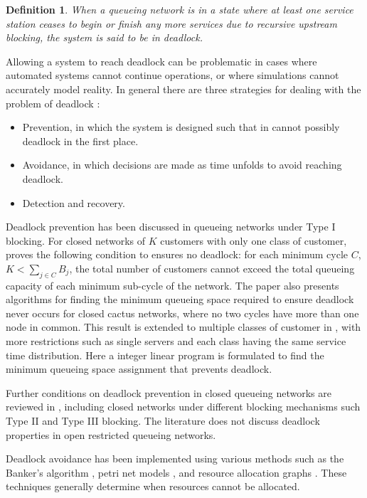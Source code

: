 \documentclass{article}
\newtheorem{definition}{Definition}
\numberwithin{equation}{section}
\begin{document}
\begin{definition}
    When a queueing network is in a state where at least one service
    station ceases to begin or finish any more services due to
    recursive upstream blocking, the system is said to be in deadlock.
\end{definition}


Allowing a system to reach deadlock can be problematic in cases where automated systems cannot continue operations, or where simulations cannot accurately model reality.
In general there are three strategies for dealing with the problem of deadlock \cite{kawadkaretal14, elmagarmid86}:

\begin{itemize}
  \item Prevention, in which the system is designed such that in cannot possibly deadlock in the first place.
  \item Avoidance, in which decisions are made as time unfolds to avoid reaching deadlock.
  \item Detection and recovery.
\end{itemize}

Deadlock prevention has been discussed in queueing networks under Type I blocking.
For closed networks of $K$ customers with only one class of customer, \cite{kunduakyildiz89} proves the following condition to ensures no deadlock: for each minimum cycle $C$, $K < \sum_{j\in C} B_j$, the total number of customers cannot exceed the total queueing capacity of each minimum sub-cycle of the network.
The paper also presents algorithms for finding the minimum queueing space required to ensure deadlock never occurs for closed cactus networks, where no two cycles have more than one node in common.
This result is extended to multiple classes of customer in \cite{liebeherrakyildiz95}, with more restrictions such as single servers and each class having the same service time distribution.
Here a integer linear program is formulated to find the minimum queueing space assignment that prevents deadlock.

Further conditions on deadlock prevention in closed queueing networks are reviewed in \cite{onvural90}, including closed networks under different blocking mechanisms such Type II and Type III blocking.
The literature does not discuss deadlock properties in open restricted queueing networks.

Deadlock avoidance has been implemented using various methods such as the Banker's algorithm \cite{dijkstra82, kawadkaretal14}, petri net models \cite{viswanadhametal90, ezpeletaetal02}, and resource allocation graphs \cite{belik90}.
These techniques generally determine when resources cannot be allocated.
\end{document}
